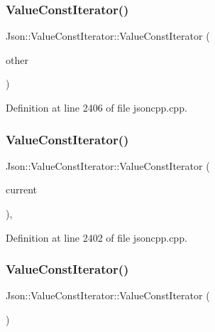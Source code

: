 \subsubsection{\texorpdfstring{Value\+Const\+Iterator()}{ValueConstIterator()}\hspace{0.1cm}{\footnotesize\ttfamily [2/6]}}
{\footnotesize\ttfamily Json\+::\+Value\+Const\+Iterator\+::\+Value\+Const\+Iterator (\begin{DoxyParamCaption}\item[{\hyperlink{class_json_1_1_value_iterator}{Value\+Iterator} const \&}]{other }\end{DoxyParamCaption})}



Definition at line 2406 of file jsoncpp.\+cpp.

\hypertarget{class_json_1_1_value_const_iterator_aa0a87edf5f1097f91dca5f2a389c4abd}{}\label{class_json_1_1_value_const_iterator_aa0a87edf5f1097f91dca5f2a389c4abd} 
\subsubsection{\texorpdfstring{Value\+Const\+Iterator()}{ValueConstIterator()}\hspace{0.1cm}{\footnotesize\ttfamily [3/6]}}
{\footnotesize\ttfamily Json\+::\+Value\+Const\+Iterator\+::\+Value\+Const\+Iterator (\begin{DoxyParamCaption}\item[{const Value\+::\+Object\+Values\+::iterator \&}]{current }\end{DoxyParamCaption})\hspace{0.3cm}{\ttfamily [explicit]}, {\ttfamily [private]}}



Definition at line 2402 of file jsoncpp.\+cpp.

\hypertarget{class_json_1_1_value_const_iterator_a1b10a46f1606421b0663492a5f9a2aad}{}\label{class_json_1_1_value_const_iterator_a1b10a46f1606421b0663492a5f9a2aad} 
\subsubsection{\texorpdfstring{Value\+Const\+Iterator()}{ValueConstIterator()}\hspace{0.1cm}{\footnotesize\ttfamily [4/6]}}
{\footnotesize\ttfamily Json\+::\+Value\+Const\+Iterator\+::\+Value\+Const\+Iterator (\begin{DoxyParamCaption}{ }\end{DoxyParamCaption})}

